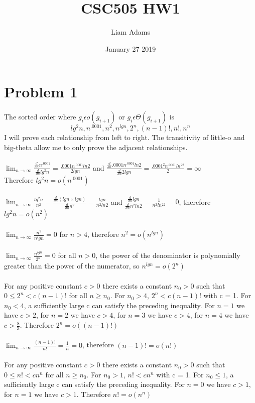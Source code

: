 \documentclass{article}
\title{CSC505 HW1}
\author{Liam Adams}
\date{January 27 2019}
\begin{document}
\maketitle

\section*{Problem 1}
The sorted order where $g_i\epsilon o(g_{i+1})$ or $g_i \epsilon\Theta(g_{i+1})$ is $$lg^2n, n^{.0001}, n^2, n^{lgn}, 2^n, (n-1)!, n!, n^n$$ I will prove each relationship from left to right. The transitivity of little-o and big-theta allow me to only prove the adjacent relationships.\\\\
$\lim_{n \to \infty}\frac{\frac{d}{dn}n^.0001}{\frac{d}{dn}lg^2n} = \frac{.0001n^{.0001}ln2}{2lgn}$ and $\frac{\frac{d}{dn}.0001n^{.0001}ln2}{\frac{d}{dn}2lgn} = \frac{.0001^2n^{.0001}ln^22}{2} = \infty$\\
Therefore $lg^2n=o(n^{.0001})$\\\\
$\lim_{n \to \infty}\frac{lg^2n}{n^2}=\frac{\frac{d}{dn}(lgn\times lgn)}{\frac{d}{dn}n^2}=\frac{lgn}{n^2ln2}$ and $\frac{\frac{d}{dn}lgn}{\frac{d}{dn}n^2ln2}=\frac{1}{n^2ln^22}= 0$, therefore $lg^2n=o(n^2)$\\\\
$\lim_{n \to \infty}\frac{n^2}{n^lgn} = 0$ for $n>4$, therefore $n^2=o(n^{lgn})$\\\\
$\lim_{n \to \infty}\frac{n^{lgn}}{2^n} = 0$ for all $n>0$, the power of the denominator is polynomially greater than the power of the numerator, so $n^{lgn}=o(2^n)$\\\\
For any positive constant $c > 0$ there exists a constant $n_0>0$ such that $0 \leq 2^{n} < c(n-1)!$ for all $n \geq n_0$. For $n_0>4$, $2^n < c(n-1)!$ with c = 1. For $n_0<4$, a sufficiently large c can satisfy the preceding inequality. For $n=1$ we have $c>2$, for $n=2$ we have $c>4$, for $n=3$ we have $c>4$, for $n=4$ we have $c>\frac{8}{3}$. Therefore $2^{n}=o((n-1)!)$\\\\
$\lim_{n \to \infty}\frac{(n-1)!}{n!}=\frac{1}{n}=0$, therefore $(n-1)!=o(n!)$\\\\
For any positive constant $c > 0$ there exists a constant $n_0>0$ such that $0 \leq n! < cn^n$ for all $n \geq n_0$. For $n_0>1$, $n! < cn^n$ with c = 1. For $n_0\leq 1$, a sufficiently large c can satisfy the preceding inequality. For $n=0$ we have $c>1$, for $n=1$ we have $c>1$. Therefore $n!=o(n^n)$\\\\
\end{document}
